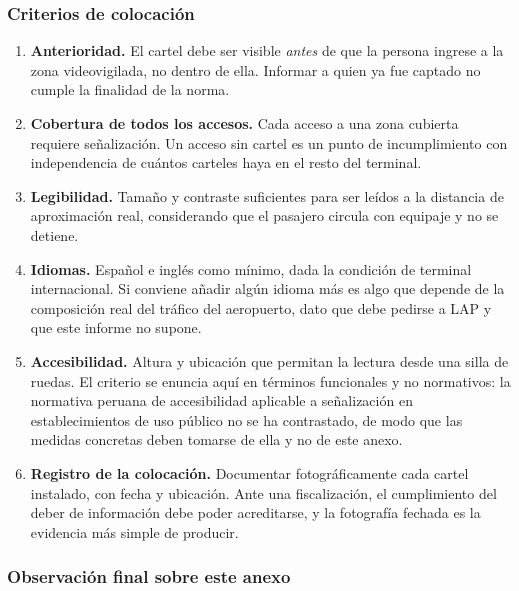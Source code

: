 \vspace{0.8em}

\subsubsection{Criterios de colocación}

\begin{enumerate}[leftmargin=1.6em,itemsep=0.35em]
  \item \textbf{Anterioridad.} El cartel debe ser visible \emph{antes} de
        que la persona ingrese a la zona videovigilada, no dentro de
        ella. Informar a quien ya fue captado no cumple la finalidad de
        la norma.
  \item \textbf{Cobertura de todos los accesos.} Cada acceso a una zona
        cubierta requiere señalización. Un acceso sin cartel es un punto
        de incumplimiento con independencia de cuántos carteles haya en
        el resto del terminal.
  \item \textbf{Legibilidad.} Tamaño y contraste suficientes para ser
        leídos a la distancia de aproximación real, considerando que el
        pasajero circula con equipaje y no se detiene.
  \item \textbf{Idiomas.} Español e inglés como mínimo, dada la condición
        de terminal internacional. Si conviene añadir algún idioma más es
        algo que depende de la composición real del tráfico del
        aeropuerto, dato que debe pedirse a LAP y que este informe no
        supone.
  \item \textbf{Accesibilidad.} Altura y ubicación que permitan la
        lectura desde una silla de ruedas. El criterio se enuncia aquí en
        términos funcionales y no normativos: la normativa peruana de
        accesibilidad aplicable a señalización en establecimientos de uso
        público no se ha contrastado, de modo que las medidas concretas
        deben tomarse de ella y no de este anexo.
  \item \textbf{Registro de la colocación.} Documentar fotográficamente
        cada cartel instalado, con fecha y ubicación. Ante una
        fiscalización, el cumplimiento del deber de información debe
        poder acreditarse, y la fotografía fechada es la evidencia más
        simple de producir.
\end{enumerate}

\subsubsection{Observación final sobre este anexo}

